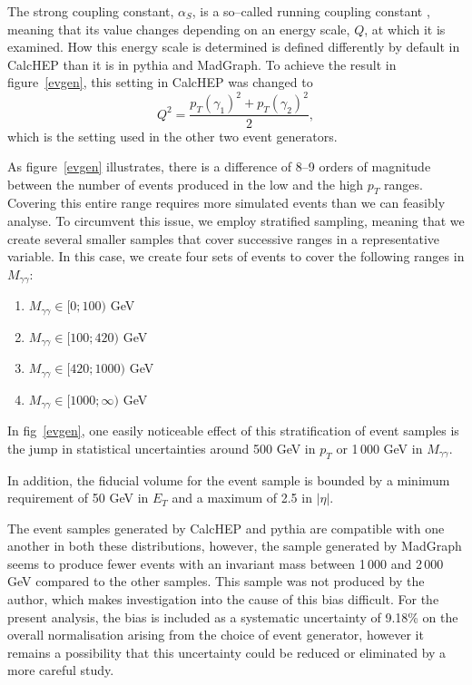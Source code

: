The strong coupling constant, $\alpha_S$, is a so--called running coupling constant \cite{greenhpt}, meaning that its value changes depending on an energy scale, $Q$, at which it is examined. How this energy scale is determined is defined differently by default in CalcHEP than it is in pythia and MadGraph. To achieve the result in figure~\ref{evgen}, this setting in CalcHEP was changed to 
\[Q^2=\frac{p_T(\gamma_1)^2+p_T(\gamma_2)^2}{2},\]
which is the setting used in the other two event generators.

As figure~\ref{evgen} illustrates, there is a difference of 8--9 orders of magnitude between the number of events produced in the low and the high $p_T$ ranges. Covering this entire range requires more simulated events than we can feasibly analyse. To circumvent this issue, we employ stratified sampling, meaning that we create several smaller samples that cover successive ranges in a representative variable. In this case, we create four sets of events to cover the following ranges in $M_{\gamma\gamma}$:
\begin{enumerate}
\item $M_{\gamma\gamma} \in [ 0 ; 100 )$ GeV
\item $M_{\gamma\gamma} \in [ 100 ; 420 )$ GeV
\item $M_{\gamma\gamma} \in [ 420 ; 1000 )$ GeV
\item $M_{\gamma\gamma} \in [ 1000 ; \infty )$ GeV
\end{enumerate}
In fig~\ref{evgen}, one easily noticeable effect of this stratification of event samples is the jump in statistical uncertainties around 500 GeV in $p_T$ or 1\,000 GeV in $M_{\gamma\gamma}$.

In addition, the fiducial volume for the event sample is bounded by a minimum requirement of 50 GeV in $E_T$ and a maximum of 2.5 in $|\eta|$.

The event samples generated by CalcHEP and pythia are compatible with one another in both these distributions, however, the sample generated by MadGraph seems to produce fewer events with an invariant mass between 1\,000 and 2\,000 GeV compared to the other samples. This sample was not produced by the author, which makes investigation into the cause of this bias difficult. For the present analysis, the bias is included as a systematic uncertainty of 9.18\% on the overall normalisation arising from the choice of event generator, however it remains a possibility that this uncertainty could be reduced or eliminated by a more careful study.


